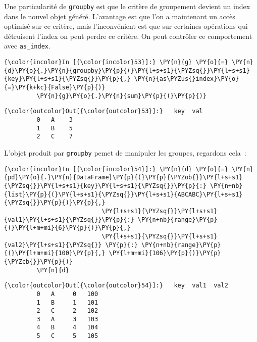 Une particularité de \texttt{groupby} est que le critère de groupement
devient un index dans le nouvel objet généré. L'avantage est que l'on a
maintenant un accès optimisé sur ce critère, mais l'inconvénient est que
sur certaines opérations qui détruisent l'index on peut perdre ce
critère. On peut contrôler ce comportement avec \texttt{as\_index}.

    \begin{Verbatim}[commandchars=\\\{\},frame=single,framerule=0.3mm,rulecolor=\color{cellframecolor}]
{\color{incolor}In [{\color{incolor}53}]:} \PY{n}{g} \PY{o}{=} \PY{n}{d}\PY{o}{.}\PY{n}{groupby}\PY{p}{(}\PY{l+s+s1}{\PYZsq{}}\PY{l+s+s1}{key}\PY{l+s+s1}{\PYZsq{}}\PY{p}{,} \PY{n}{as\PYZus{}index}\PY{o}{=}\PY{k+kc}{False}\PY{p}{)}
         \PY{n}{g}\PY{o}{.}\PY{n}{sum}\PY{p}{(}\PY{p}{)}
\end{Verbatim}


\begin{Verbatim}[commandchars=\\\{\},frame=single,framerule=0.3mm,rulecolor=\color{cellframecolor}]
{\color{outcolor}Out[{\color{outcolor}53}]:}   key  val
         0   A    3
         1   B    5
         2   C    7
\end{Verbatim}
            
    L'objet produit par \texttt{groupby} pemet de manipuler les groupes,
regardons cela~:

    \begin{Verbatim}[commandchars=\\\{\},frame=single,framerule=0.3mm,rulecolor=\color{cellframecolor}]
{\color{incolor}In [{\color{incolor}54}]:} \PY{n}{d} \PY{o}{=} \PY{n}{pd}\PY{o}{.}\PY{n}{DataFrame}\PY{p}{(}\PY{p}{\PYZob{}}\PY{l+s+s1}{\PYZsq{}}\PY{l+s+s1}{key}\PY{l+s+s1}{\PYZsq{}}\PY{p}{:} \PY{n+nb}{list}\PY{p}{(}\PY{l+s+s1}{\PYZsq{}}\PY{l+s+s1}{ABCABC}\PY{l+s+s1}{\PYZsq{}}\PY{p}{)}\PY{p}{,}
                           \PY{l+s+s1}{\PYZsq{}}\PY{l+s+s1}{val1}\PY{l+s+s1}{\PYZsq{}}\PY{p}{:} \PY{n+nb}{range}\PY{p}{(}\PY{l+m+mi}{6}\PY{p}{)}\PY{p}{,}
                           \PY{l+s+s1}{\PYZsq{}}\PY{l+s+s1}{val2}\PY{l+s+s1}{\PYZsq{}} \PY{p}{:} \PY{n+nb}{range}\PY{p}{(}\PY{l+m+mi}{100}\PY{p}{,} \PY{l+m+mi}{106}\PY{p}{)}\PY{p}{\PYZcb{}}\PY{p}{)}
         \PY{n}{d}
\end{Verbatim}


\begin{Verbatim}[commandchars=\\\{\},frame=single,framerule=0.3mm,rulecolor=\color{cellframecolor}]
{\color{outcolor}Out[{\color{outcolor}54}]:}   key  val1  val2
         0   A     0   100
         1   B     1   101
         2   C     2   102
         3   A     3   103
         4   B     4   104
         5   C     5   105
\end{Verbatim}
            
